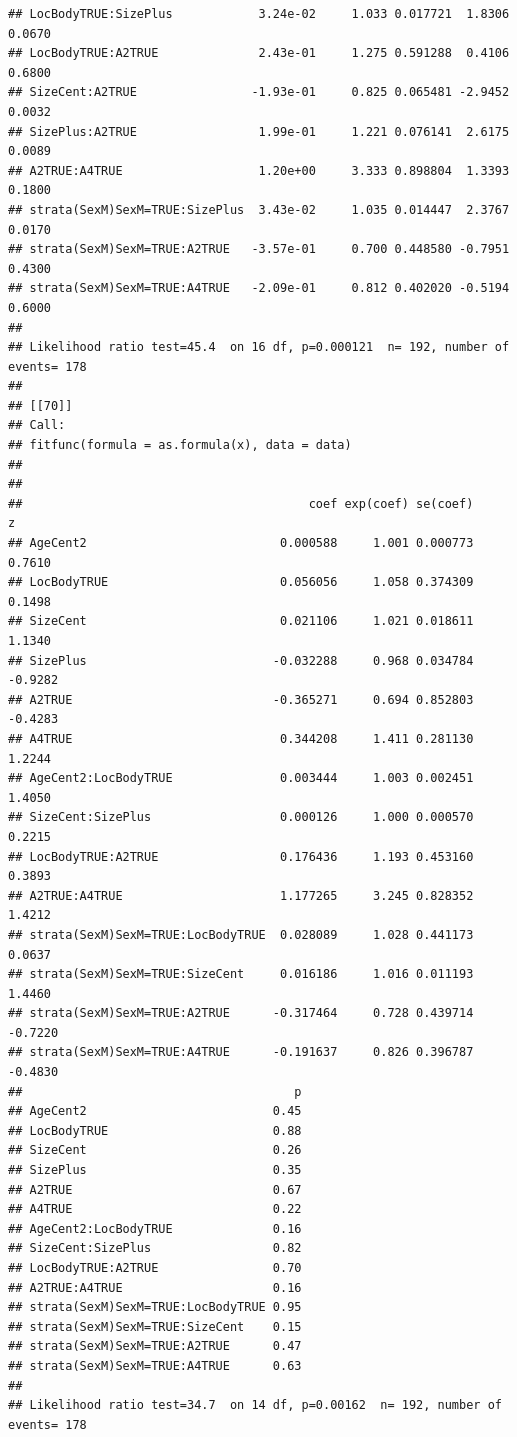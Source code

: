 \documentclass{article}\usepackage[]{graphicx}\usepackage[]{color}
\makeatletter
\newenvironment{kframe}{%
 \def\at@end@of@kframe{}%
 \ifinner\ifhmode%
  \def\at@end@of@kframe{\end{minipage}}%
  \begin{minipage}{\columnwidth}%
 \fi\fi%
 \def\FrameCommand##1{\hskip\@totalleftmargin \hskip-\fboxsep
 \colorbox{shadecolor}{##1}\hskip-\fboxsep
     \hskip-\linewidth \hskip-\@totalleftmargin \hskip\columnwidth}%
 \MakeFramed {\advance\hsize-\width
   \@totalleftmargin\z@ \linewidth\hsize
   \@setminipage}}%
 {\par\unskip\endMakeFramed%
 \at@end@of@kframe}
\newenvironment{knitrout}{}{} %
\makeatother
\begin{document}
\begin{knitrout}
\begin{kframe}
\begin{verbatim}
## LocBodyTRUE:SizePlus            3.24e-02     1.033 0.017721  1.8306 0.0670
## LocBodyTRUE:A2TRUE              2.43e-01     1.275 0.591288  0.4106 0.6800
## SizeCent:A2TRUE                -1.93e-01     0.825 0.065481 -2.9452 0.0032
## SizePlus:A2TRUE                 1.99e-01     1.221 0.076141  2.6175 0.0089
## A2TRUE:A4TRUE                   1.20e+00     3.333 0.898804  1.3393 0.1800
## strata(SexM)SexM=TRUE:SizePlus  3.43e-02     1.035 0.014447  2.3767 0.0170
## strata(SexM)SexM=TRUE:A2TRUE   -3.57e-01     0.700 0.448580 -0.7951 0.4300
## strata(SexM)SexM=TRUE:A4TRUE   -2.09e-01     0.812 0.402020 -0.5194 0.6000
## 
## Likelihood ratio test=45.4  on 16 df, p=0.000121  n= 192, number of events= 178 
## 
## [[70]]
## Call:
## fitfunc(formula = as.formula(x), data = data)
## 
## 
##                                        coef exp(coef) se(coef)       z
## AgeCent2                           0.000588     1.001 0.000773  0.7610
## LocBodyTRUE                        0.056056     1.058 0.374309  0.1498
## SizeCent                           0.021106     1.021 0.018611  1.1340
## SizePlus                          -0.032288     0.968 0.034784 -0.9282
## A2TRUE                            -0.365271     0.694 0.852803 -0.4283
## A4TRUE                             0.344208     1.411 0.281130  1.2244
## AgeCent2:LocBodyTRUE               0.003444     1.003 0.002451  1.4050
## SizeCent:SizePlus                  0.000126     1.000 0.000570  0.2215
## LocBodyTRUE:A2TRUE                 0.176436     1.193 0.453160  0.3893
## A2TRUE:A4TRUE                      1.177265     3.245 0.828352  1.4212
## strata(SexM)SexM=TRUE:LocBodyTRUE  0.028089     1.028 0.441173  0.0637
## strata(SexM)SexM=TRUE:SizeCent     0.016186     1.016 0.011193  1.4460
## strata(SexM)SexM=TRUE:A2TRUE      -0.317464     0.728 0.439714 -0.7220
## strata(SexM)SexM=TRUE:A4TRUE      -0.191637     0.826 0.396787 -0.4830
##                                      p
## AgeCent2                          0.45
## LocBodyTRUE                       0.88
## SizeCent                          0.26
## SizePlus                          0.35
## A2TRUE                            0.67
## A4TRUE                            0.22
## AgeCent2:LocBodyTRUE              0.16
## SizeCent:SizePlus                 0.82
## LocBodyTRUE:A2TRUE                0.70
## A2TRUE:A4TRUE                     0.16
## strata(SexM)SexM=TRUE:LocBodyTRUE 0.95
## strata(SexM)SexM=TRUE:SizeCent    0.15
## strata(SexM)SexM=TRUE:A2TRUE      0.47
## strata(SexM)SexM=TRUE:A4TRUE      0.63
## 
## Likelihood ratio test=34.7  on 14 df, p=0.00162  n= 192, number of events= 178 

\end{verbatim}
\end{kframe}
\end{knitrout}
\end{document}
